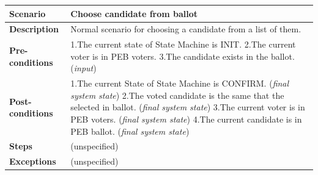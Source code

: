 \documentclass{article}
\begin{document}
\begin{center}
    \begin{tabular}{ | l | p{9cm} |}
    \hline
   \textbf{Scenario}	& \textbf{Choose candidate from ballot}  \\ \hline
    \textbf{Description}	& Normal scenario for choosing a candidate from a list of them. \\ \hline
   \textbf{Pre-conditions}	& 1.The current state of State Machine is INIT.\linebreak
2.The current voter is in PEB voters.\linebreak
3.The candidate exists in the ballot.
 (\textit{input})
\\ \hline
 \textbf{Post-conditions} &1.The current State of State Machine is CONFIRM. (\textit{final system state})\linebreak
2.The voted candidate is the same that the selected in ballot. (\textit{final system state})\linebreak
3.The current voter is in PEB voters. (\textit{final system state})\linebreak
4.The current candidate is in PEB ballot. (\textit{final system state})

   \\ \hline
   \textbf{Steps} &	(unspecified) \\ 
    \hline
\textbf{Exceptions}& 	(unspecified)
 \\ 
    \hline
    \end{tabular}
\end{center}
\end{document}
